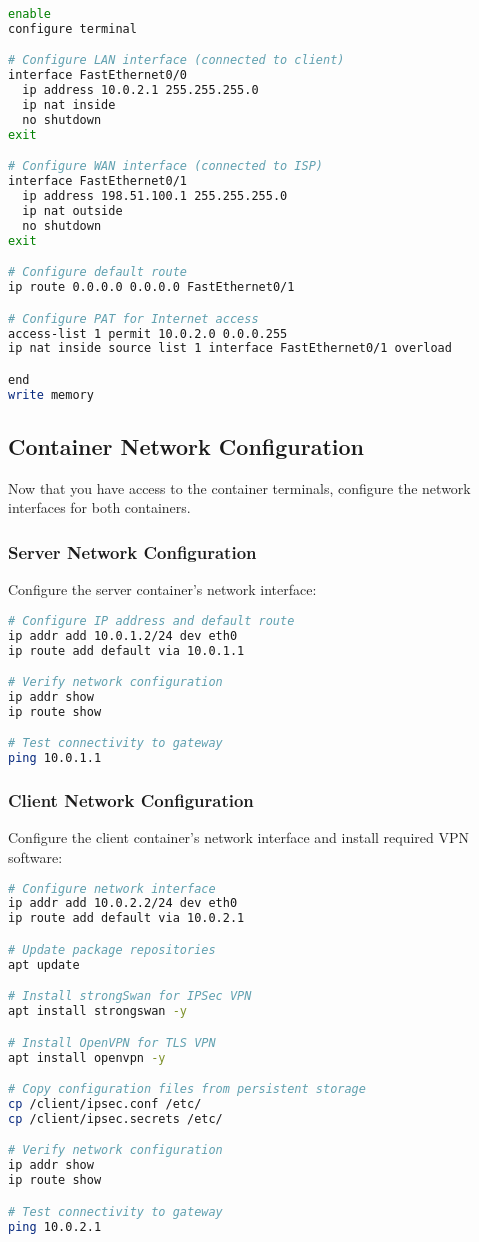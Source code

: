 \begin{lstlisting}[language=bash]
enable
configure terminal

# Configure LAN interface (connected to client)
interface FastEthernet0/0
  ip address 10.0.2.1 255.255.255.0
  ip nat inside
  no shutdown
exit

# Configure WAN interface (connected to ISP)
interface FastEthernet0/1
  ip address 198.51.100.1 255.255.255.0
  ip nat outside
  no shutdown
exit

# Configure default route
ip route 0.0.0.0 0.0.0.0 FastEthernet0/1

# Configure PAT for Internet access
access-list 1 permit 10.0.2.0 0.0.0.255
ip nat inside source list 1 interface FastEthernet0/1 overload

end
write memory
\end{lstlisting}

\subsection{Container Network Configuration}

Now that you have access to the container terminals, configure the network interfaces for both containers.

\subsubsection{Server Network Configuration}

Configure the server container's network interface:

\begin{lstlisting}[language=bash]
# Configure IP address and default route
ip addr add 10.0.1.2/24 dev eth0
ip route add default via 10.0.1.1

# Verify network configuration
ip addr show
ip route show

# Test connectivity to gateway
ping 10.0.1.1
\end{lstlisting}

\subsubsection{Client Network Configuration}

Configure the client container's network interface and install required VPN software:

\begin{lstlisting}[language=bash]
# Configure network interface
ip addr add 10.0.2.2/24 dev eth0
ip route add default via 10.0.2.1

# Update package repositories
apt update

# Install strongSwan for IPSec VPN
apt install strongswan -y

# Install OpenVPN for TLS VPN  
apt install openvpn -y

# Copy configuration files from persistent storage
cp /client/ipsec.conf /etc/
cp /client/ipsec.secrets /etc/

# Verify network configuration
ip addr show
ip route show

# Test connectivity to gateway
ping 10.0.2.1
\end{lstlisting}

